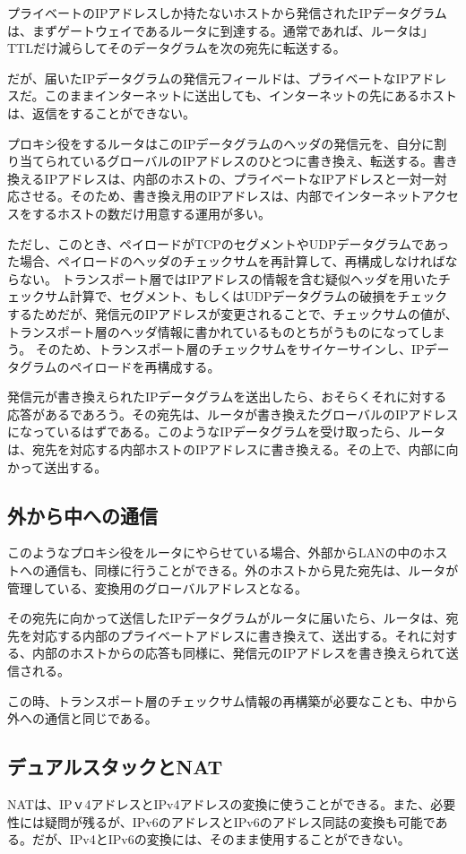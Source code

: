 プライベートのIPアドレスしか持たないホストから発信されたIPデータグラムは、まずゲートウェイであるルータに到達する。通常であれば、ルータは」TTLだけ減らしてそのデータグラムを次の宛先に転送する。

だが、届いたIPデータグラムの発信元フィールドは、プライベートなIPアドレスだ。このままインターネットに送出しても、インターネットの先にあるホストは、返信をすることができない。

プロキシ役をするルータはこのIPデータグラムのヘッダの発信元を、自分に割り当てられているグローバルのIPアドレスのひとつに書き換え、転送する。書き換えるIPアドレスは、内部のホストの、プライベートなIPアドレスと一対一対応させる。そのため、書き換え用のIPアドレスは、内部でインターネットアクセスをするホストの数だけ用意する運用が多い。

ただし、このとき、ペイロードがTCPのセグメントやUDPデータグラムであった場合、ペイロードのヘッダのチェックサムを再計算して、再構成しなければならない。
トランスポート層ではIPアドレスの情報を含む疑似ヘッダを用いたチェックサム計算で、セグメント、もしくはUDPデータグラムの破損をチェックするためだが、発信元のIPアドレスが変更されることで、チェックサムの値が、トランスポート層のヘッダ情報に書かれているものとちがうものになってしまう。
そのため、トランスポート層のチェックサムをサイケーサインし、IPデータグラムのペイロードを再構成する。

発信元が書き換えられたIPデータグラムを送出したら、おそらくそれに対する応答があるであろう。その宛先は、ルータが書き換えたグローバルのIPアドレスになっているはずである。このようなIPデータグラムを受け取ったら、ルータは、宛先を対応する内部ホストのIPアドレスに書き換える。その上で、内部に向かって送出する。


\subsection{外から中への通信}
このようなプロキシ役をルータにやらせている場合、外部からLANの中のホストへの通信も、同様に行うことができる。外のホストから見た宛先は、ルータが管理している、変換用のグローバルアドレスとなる。

その宛先に向かって送信したIPデータグラムがルータに届いたら、ルータは、宛先を対応する内部のプライベートアドレスに書き換えて、送出する。それに対する、内部のホストからの応答も同様に、発信元のIPアドレスを書き換えられて送信される。

この時、トランスポート層のチェックサム情報の再構築が必要なことも、中から外への通信と同じである。

\subsection{デュアルスタックとNAT}
NATは、IPｖ4アドレスとIPv4アドレスの変換に使うことができる。また、必要性には疑問が残るが、IPv6のアドレスとIPv6のアドレス同誌の変換も可能である。だが、IPv4とIPv6の変換には、そのまま使用することができない。

